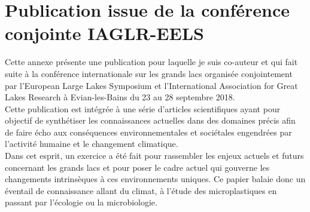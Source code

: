 \chapter{Publication issue de la conférence conjointe IAGLR-EELS}
\noindent Cette annexe présente une publication pour laquelle je suis co-auteur et qui fait suite à la conférence internationale sur les grands lacs organisée conjointement par l'European Large Lakes Symposium et l'International Association for Great Lakes Research à Evian-les-Bains du 23 au 28 septembre 2018.\\
Cette publication est intégrée à une série d'articles scientifiques ayant pour objectif de synthétiser les connaissances actuelles dans des domaines précis afin de faire écho aux conséquences environnementales et sociétales engendrées par l'activité humaine et le changement climatique. \\
Dans cet esprit, un exercice a été fait pour rassembler les enjeux actuels et futurs concernant les grands lacs et pour poser le cadre actuel qui gouverne les changements intrinsèques à ces environnements uniques. Ce papier balaie donc un éventail de connaissance allant du climat, à l'étude des microplastiques en passant par l'écologie ou la microbiologie.

\vfill

\vfill
